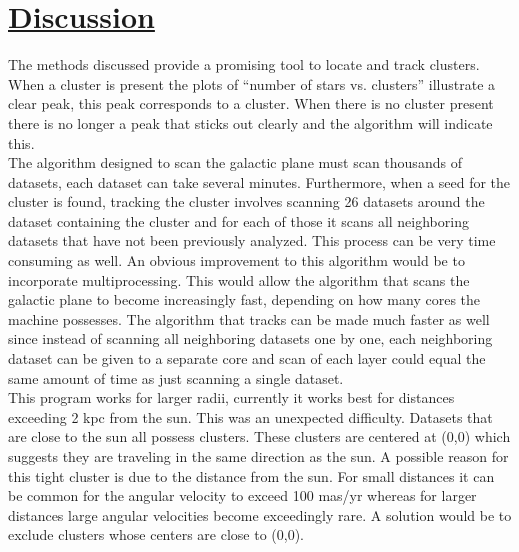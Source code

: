 \documentclass[12pt]{amsart}
\begin{document}
\section{\underline{Discussion}}
\indent The methods discussed provide a promising tool to locate and track clusters. When a cluster is present the plots of “number of stars vs. clusters” illustrate a clear peak, this peak corresponds to a cluster. When there is no cluster present there is no longer a peak that sticks out clearly and the algorithm will indicate this. \\
\indent The algorithm designed to scan the galactic plane must scan thousands of datasets, each dataset can take several minutes. Furthermore, when a seed for the cluster is found, tracking the cluster involves scanning 26 datasets around the dataset containing the cluster and for each of those it scans all neighboring datasets that have not been previously analyzed. This process can be very time consuming as well. An obvious improvement to this algorithm would be to incorporate multiprocessing. This would allow the algorithm that scans the galactic plane to become increasingly fast, depending on how many cores the machine possesses. The algorithm that tracks can be made much faster as well  since instead of scanning all neighboring datasets one by one, each neighboring dataset can be given to a separate core and scan of each layer could equal the same amount of time as just scanning a single dataset.\\
\indent This program works for larger radii, currently it works best for distances exceeding 2 kpc from the sun. This was an unexpected difficulty. Datasets that are close to the sun all possess clusters. These clusters are centered at (0,0) which suggests they are traveling in the same direction as the sun. A possible reason for this tight cluster is due to the distance from the sun. For small distances it can be common for the angular velocity to exceed 100 mas/yr whereas for larger distances large angular velocities become exceedingly rare. A solution would be to exclude clusters whose centers are close to (0,0).
	
	
\end{document}
